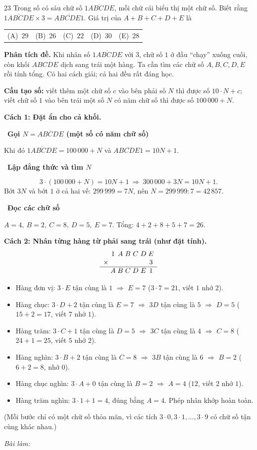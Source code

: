 \documentclass[11pt]{article}
\makeatletter
\newif\ifsol \solfalse
\newenvironment{probbox}[2]{\begin{probboxT}{#1}{#2}}{\end{probboxT}}
\newcommand{\StuProb}[2]{\begin{probboxS}{#1}{#2}\StuProbBody\end{probboxS}}
\newcommand{\probsol}[1]{%
  \begin{lrbox}{\solmeasure}\begin{minipage}{\dimexpr\linewidth-24pt\relax}#1\end{minipage}\end{lrbox}%
  \ifsol
    \begin{solbox}#1\end{solbox}%
  \else
    \setlength{\solht}{\dimexpr\ht\solmeasure+\dp\solmeasure+0.85cm\relax}%
    \ifdim\solht<1.35cm\setlength{\solht}{1.35cm}\fi
    \ifdim\solht>\StudentMaxWork\setlength{\solht}{\StudentMaxWork}\fi
    \par\noindent\begin{minipage}{\linewidth}%
    \expandafter\StuProb\StuProbArgs
    \begin{tcolorbox}[colback=white,colframe=Line,boxrule=0.8pt,arc=5pt,
      left=8pt,right=8pt,top=4pt,bottom=4pt,height=\solht]{\footnotesize\color{Slate}\itshape\WorkWord}\end{tcolorbox}%
    \end{minipage}\par\medskip
  \fi}
\newcommand{\nd}[1]{\overline{#1}}
\newlength{\StudentMaxWork}\setlength{\StudentMaxWork}{4.5cm}
\newcommand{\step}[2]{\par\smallskip\noindent{\bfseries\color{tmBlue!85!black}\StepWord~#1.}\ {\bfseries #2}\par\nopagebreak}
\newcommand{\choices}[5]{\par\smallskip\noindent
  \begin{tabularx}{\linewidth}{@{}XXXXX@{}}(A)\ #1&(B)\ #2&(C)\ #3&(D)\ #4&(E)\ #5\end{tabularx}\par}
\def\WorkWord{Bài làm:}
\def\StepWord{Bước}
\makeatother
\begin{document}
\begin{probbox}{23}{\relax}
Trong số có sáu chữ số $\nd{1ABCDE}$, mỗi chữ cái biểu thị một chữ số. Biết rằng $\nd{1ABCDE}\times 3=\nd{ABCDE1}$. Giá trị của $A+B+C+D+E$ là
\choices{$29$}{$26$}{$22$}{$30$}{$28$}
\end{probbox}
\probsol{
\textbf{Phân tích đề.} Khi nhân số $\nd{1ABCDE}$ với $3$, chữ số $1$ ở đầu ``chạy'' xuống cuối, còn khối $ABCDE$ dịch sang trái một hàng. Ta cần tìm các chữ số $A,B,C,D,E$ rồi tính tổng. Có hai cách giải; cả hai đều rất đáng học.

\begin{recallbox}\textbf{Cấu tạo số:} viết thêm một chữ số $c$ vào bên phải số $N$ thì được số $10\cdot N+c$; viết chữ số $1$ vào bên trái một số $N$ có năm chữ số thì được số $100\,000+N$.\end{recallbox}

\textbf{Cách 1: Đặt ẩn cho cả khối.}
\step{1}{Gọi $N=\nd{ABCDE}$ (một số có năm chữ số)}
Khi đó $\nd{1ABCDE}=100\,000+N$ và $\nd{ABCDE1}=10N+1$.
\step{2}{Lập đẳng thức và tìm $N$}
\[3\cdot(100\,000+N)=10N+1\ \Longrightarrow\ 300\,000+3N=10N+1.\]
Bớt $3N$ và bớt $1$ ở cả hai vế: $299\,999=7N$, nên $N=299\,999:7=42\,857$.
\step{3}{Đọc các chữ số}
$A=4,\ B=2,\ C=8,\ D=5,\ E=7$. Tổng: $4+2+8+5+7=26$.

\textbf{Cách 2: Nhân từng hàng từ phải sang trái (như đặt tính).}
\[\begin{array}{r@{\;}c@{\;}c@{\;}c@{\;}c@{\;}c@{\;}c}
 & 1 & A & B & C & D & E\\
\times & & & & & & 3\\ \hline
 & A & B & C & D & E & 1
\end{array}\]
\begin{itemize}[leftmargin=1.4em,itemsep=1pt]
\item Hàng đơn vị: $3\cdot E$ tận cùng là $1$ $\Rightarrow$ $E=7$ ($3\cdot 7=21$, viết $1$ nhớ $2$).
\item Hàng chục: $3\cdot D+2$ tận cùng là $E=7$ $\Rightarrow$ $3D$ tận cùng là $5$ $\Rightarrow$ $D=5$ ($15+2=17$, viết $7$ nhớ $1$).
\item Hàng trăm: $3\cdot C+1$ tận cùng là $D=5$ $\Rightarrow$ $3C$ tận cùng là $4$ $\Rightarrow$ $C=8$ ($24+1=25$, viết $5$ nhớ $2$).
\item Hàng nghìn: $3\cdot B+2$ tận cùng là $C=8$ $\Rightarrow$ $3B$ tận cùng là $6$ $\Rightarrow$ $B=2$ ($6+2=8$, nhớ $0$).
\item Hàng chục nghìn: $3\cdot A+0$ tận cùng là $B=2$ $\Rightarrow$ $A=4$ ($12$, viết $2$ nhớ $1$).
\item Hàng trăm nghìn: $3\cdot 1+1=4$, đúng bằng $A=4$. Phép nhân khớp hoàn toàn.
\end{itemize}
(Mỗi bước chỉ có một chữ số thỏa mãn, vì các tích $3\cdot 0, 3\cdot 1,\dots,3\cdot 9$ có chữ số tận cùng khác nhau.)

}
\end{document}
